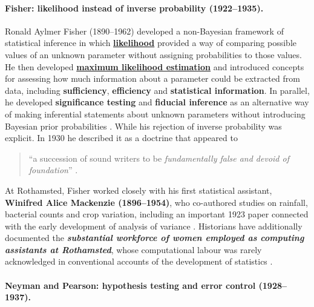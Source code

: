 \paragraph{Fisher: likelihood instead of inverse probability (1922--1935).}

Ronald Aylmer Fisher (1890--1962) developed a non-Bayesian framework of statistical inference in which \href{https://youtu.be/zgir07qRdGw?si=F4FiON4TNKXERrvz}{\textbf{likelihood}} provided a way of comparing possible values of an unknown parameter without assigning probabilities to those values. He then developed \href{https://youtu.be/Pk7kDdWuG1Q?si=ULzKm_jphNl_5-zk}{\textbf{maximum likelihood estimation}} and introduced concepts for assessing how much information about a parameter could be extracted from data, including \textbf{sufficiency}, \textbf{efficiency} and \textbf{statistical information}. In parallel, he developed \textbf{significance testing} and \textbf{fiducial inference} as an alternative way of making inferential statements about unknown parameters without introducing Bayesian prior probabilities \cite{fisher1922foundations,fisher1925statistical,fisher1930inverse, fisher1935fiducial,aldrich1997}. While his rejection of inverse probability was explicit. In 1930 he described it as a doctrine that appeared to \begin{quote} ``a succession of sound writers to be \textit{fundamentally false and devoid of foundation}'' \cite[p.~528]{fisher1930inverse}. \end{quote}

At Rothamsted, Fisher worked closely with his first statistical assistant, \textbf{Winifred Alice Mackenzie (1896--1954)}, who co-authored studies on rainfall, bacterial counts and crop variation, including an important 1923 paper connected with the early development of analysis of variance  \cite{fishermackenzie1923,tayloraldrich2022}. Historians have additionally documented the \textit{\textbf{substantial workforce of women employed as computing assistants at Rothamsted}}, whose computational labour was rarely acknowledged in conventional accounts of the development of statistics \cite{parolini2015}.



\paragraph{Neyman and Pearson: hypothesis testing and error control
(1928--1937).}

